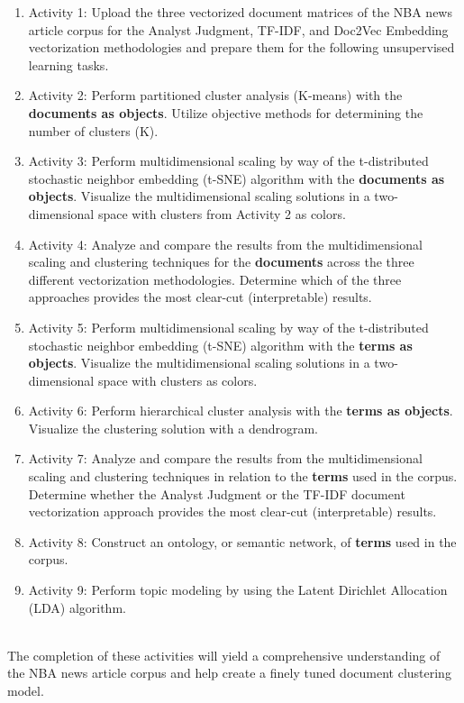 \documentclass[5p,authoryear]{elsarticle}
\begin{document}
\begin{enumerate}
 \item Activity 1: Upload the three vectorized document matrices of the NBA news article corpus for the Analyst Judgment, TF-IDF, and Doc2Vec Embedding vectorization methodologies and prepare them for the following unsupervised learning tasks.
 \item Activity 2: Perform partitioned cluster analysis (K-means) with the \textbf{documents as objects}. Utilize objective methods for determining the number of clusters (K). 
 \item Activity 3: Perform multidimensional scaling by way of the t-distributed stochastic neighbor embedding (t-SNE) algorithm with the \textbf{documents as objects}. Visualize the multidimensional scaling solutions in a two-dimensional space with clusters from Activity 2 as colors. 
 \item Activity 4: Analyze and compare the results from the multidimensional scaling and clustering techniques for the \textbf{documents} across the three different vectorization methodologies. Determine which of the three approaches provides the most clear-cut (interpretable) results.
 \item Activity 5: Perform multidimensional scaling by way of the t-distributed stochastic neighbor embedding (t-SNE) algorithm with the \textbf{terms as objects}. Visualize the multidimensional scaling solutions in a two-dimensional space with clusters as colors.
 \item Activity 6: Perform hierarchical cluster analysis with the \textbf{terms as objects}. Visualize the clustering solution with a dendrogram.
 \item Activity 7: Analyze and compare the results from the multidimensional scaling and clustering techniques in relation to the \textbf{terms} used in the corpus. Determine whether the Analyst Judgment or the TF-IDF document vectorization approach provides the most clear-cut (interpretable) results.
 \item Activity 8: Construct an ontology, or semantic network, of \textbf{terms} used in the corpus. 
 \item Activity 9: Perform topic modeling by using the Latent Dirichlet Allocation (LDA) algorithm.
\end{enumerate} \\

The completion of these activities will yield a comprehensive understanding of the NBA news article corpus and help create a finely tuned document clustering model.\\
\end{document}
